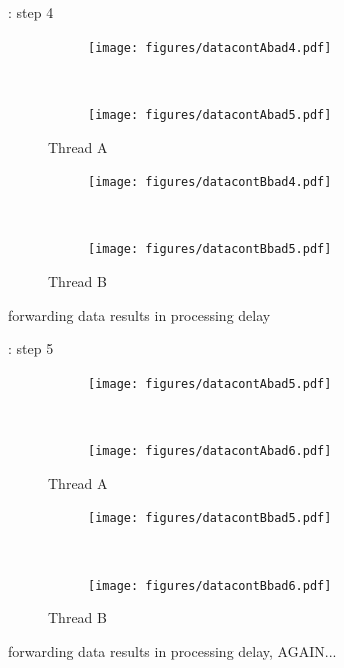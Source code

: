 \documentclass{beamer}
\begin{document}
\begin{frame}{\insertsubsection : step 4}
\centering
\begin{minipage}{0.5\linewidth}
\begin{figure}[h]%
  \begin{subfigure}[b]{\linewidth}%
  \texttt{[image: figures/datacontAbad4.pdf]}
  \end{subfigure}\\
  \vspace{1cm}
  \begin{subfigure}[b]{\linewidth}%
  \texttt{[image: figures/datacontAbad5.pdf]}
  \end{subfigure}%
  \caption{Thread A}
\end{figure}%
\end{minipage}%
\begin{minipage}{0.5\linewidth}
\begin{figure}[h]%
  \begin{subfigure}[b]{\linewidth}%
  \texttt{[image: figures/datacontBbad4.pdf]}
  \end{subfigure}\\
  \vspace{1cm}
  \begin{subfigure}[b]{\linewidth}%
  \texttt{[image: figures/datacontBbad5.pdf]}
  \end{subfigure}%
  \caption{Thread B}
\end{figure}%
\end{minipage}
forwarding data results in processing delay
\end{frame}
\begin{frame}{\insertsubsection : step 5}
\centering
\begin{minipage}{0.5\linewidth}
\begin{figure}[h]%
  \begin{subfigure}[b]{\linewidth}%
  \texttt{[image: figures/datacontAbad5.pdf]}
  \end{subfigure}\\
  \vspace{1cm}
  \begin{subfigure}[b]{\linewidth}%
  \texttt{[image: figures/datacontAbad6.pdf]}
  \end{subfigure}%
  \caption{Thread A}
\end{figure}%
\end{minipage}%
\begin{minipage}{0.5\linewidth}
\begin{figure}[h]%
  \begin{subfigure}[b]{\linewidth}%
  \texttt{[image: figures/datacontBbad5.pdf]}
  \end{subfigure}\\
  \vspace{1cm}
  \begin{subfigure}[b]{\linewidth}%
  \texttt{[image: figures/datacontBbad6.pdf]}
  \end{subfigure}%
  \caption{Thread B}
\end{figure}%
\end{minipage}
forwarding data results in processing delay, AGAIN...
\end{frame}
\end{document}
